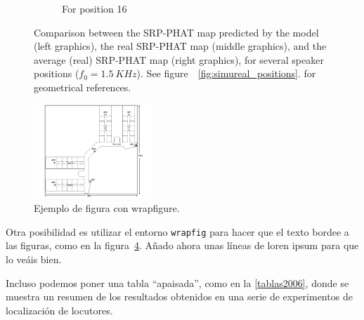 \documentclass[spanish,openright]{book}
\newcommand{\verticalSpacingSRPMaps}{-0.3cm}
\begin{document}
\begin{figure}
\begin{subfigure}[t]{0.47\textwidth}
\begin{minipage}[t]{\textwidth}
\begin{subfigure}[t]{0.3\textwidth}
\label{fig:SRP_Fo1500_mean_pos16}
\end{subfigure}
\vspace{\verticalSpacingSRPMaps}
\caption{\centering For position 16}
\vspace{0.25cm}
\end{minipage}
\end{subfigure}
\caption{Comparison between the SRP-PHAT map predicted by the model
(left graphics),
the real SRP-PHAT map (middle graphics), and the average (real)
SRP-PHAT map (right graphics), for
several speaker positions ($f_0=1.5~KHz$). See
figure~~\ref{fig:simureal_positions}.
for geometrical references.}
\label{fig:SRPvsPatternSelected}
\end{figure}

\begin{figure}
\vspace{-20pt}
\begin{center}
\includegraphics[width=0.4\textwidth]{Figure1}
\caption{Ejemplo de figura con wrapfigure.}
\label{fig:wrapfigure1}
\end{center}
\vspace{-20pt}
\vspace{1pt}
\end{figure}

Otra posibilidad es utilizar el entorno \texttt{wrapfig} para hacer que
el texto bordee a las figuras, como en la
figura~\ref{fig:wrapfigure1}. Añado ahora unas líneas de loren ipsum
para que lo veáis bien. \lipsum[1-1]





Incluso podemos poner una tabla ``apaisada'', como en la
\ref{tablas2006}, donde se muestra un resumen de los resultados
obtenidos en una serie de experimentos de localización de locutores.
\end{document}

